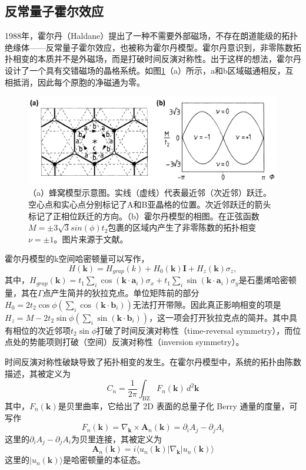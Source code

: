 \subsection{反常量子霍尔效应}
1988年，霍尔丹（Haldane）提出了一种不需要外部磁场，不存在朗道能级的拓扑绝缘体——反常量子霍尔效应\cite{haldane1988model}，也被称为霍尔丹模型。霍尔丹意识到，非零陈数拓扑相变的本质并不是外磁场，而是打破时间反演对称性。出于这样的想法，霍尔丹设计了一个具有交错磁场的晶格系统。如图\ref{fig:HaldanePaper}（a）所示，a和b区域磁通相反，互相抵消，因此每个原胞的净磁通为零。
\begin{figure}
    \centering
    \includegraphics[width=0.75\linewidth]{figure/Introduction/HaldanePaper.png}
    \caption{（a）蜂窝模型示意图。实线（虚线）代表最近邻（次近邻）跃迁。空心点和实心点分别标记了A和B亚晶格的位置。次近邻跃迁的箭头标记了正相位跃迁的方向。（b）霍尔丹模型的相图。在正弦函数$M=\pm3\sqrt{3}sin(\phi)t_2$包裹的区域内产生了非零陈数的拓扑相变$\nu=\pm1$。图片来源于文献\cite{haldane1988model}。}
    \label{fig:HaldanePaper}
\end{figure}
霍尔丹模型的k空间哈密顿量可以写作，
\begin{equation}
H(\mathbf{k}) = H_{grap}(k) + H_0(\mathbf{k}) \mathbf{I} + H_z(\mathbf{k}) \sigma_z,
\end{equation}
其中，$H_{grap}(\mathbf{k}) = t_1 \sum_i \cos(\mathbf{k} \cdot \mathbf{a}_i) \sigma_x + t_1 \sum_i \sin(\mathbf{k} \cdot \mathbf{a}_i) \sigma_y$是石墨烯哈密顿量，其在$\Gamma$点产生简并的狄拉克点。单位矩阵前的部分$H_0 = 2t_2 \cos\phi \left( \sum_i \cos(\mathbf{k} \cdot \mathbf{b}_i) \right)$无法打开带隙。因此真正影响相变的项是$H_z = M - 2t_2 \sin\phi \left( \sum_i \sin(\mathbf{k} \cdot \mathbf{b}_i) \right)$，这一项会打开狄拉克点的简并。其中具有相位的次近邻项$t_2\sin\phi$打破了时间反演对称性（time-reversal symmetry），而位点处的势能项则打破（空间）反演对称性（inversion symmetry）。

时间反演对称性破缺导致了拓扑相变的发生。在霍尔丹模型中，系统的拓扑由陈数描述，其被定义为
\begin{equation}
    C_n = \frac{1}{2\pi} \int_{\text{BZ}} F_{n}(\mathbf{k}) \, d^2\mathbf{k}
\end{equation}
其中，$F_{n}(\mathbf{k})$是贝里曲率，它给出了 2D 表面的总量子化 Berry 通量的度量，可写作
\begin{equation}
    F_{n}(\mathbf{k}) = \nabla_{\mathbf{k}} \times \mathbf{A}_{n}(\mathbf{k})=\partial_{i} A_{j} - \partial_{j} A_{i}
\end{equation}
这里的$\partial_{i} A_{j} - \partial_{j} A_{i}$为贝里连接，其被定义为
\begin{equation}
    \mathbf{A}_{n}(\mathbf{k}) = i \langle u_{n}(\mathbf{k}) | \nabla_{\mathbf{k}} | u_{n}(\mathbf{k}) \rangle
\end{equation}
这里的$| u_{n}(\mathbf{k}) \rangle$是哈密顿量的本征态。

